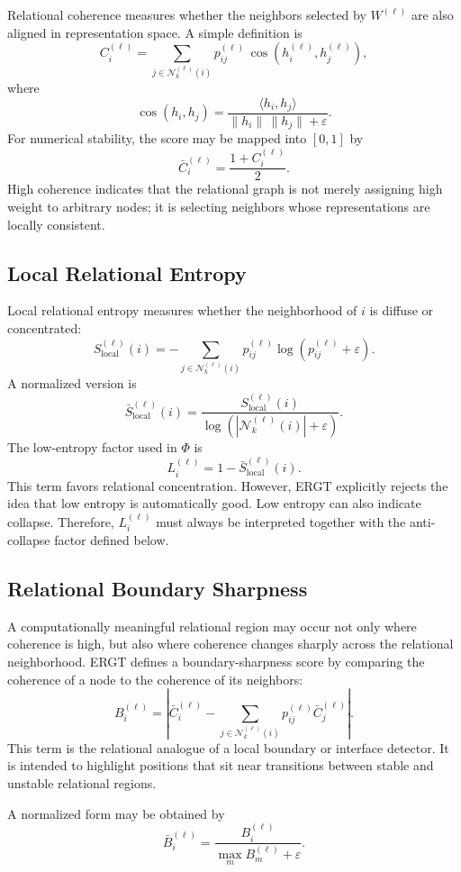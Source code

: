 \documentclass[11pt]{article}
\begin{document}
Relational coherence measures whether the neighbors selected by $W^{(\ell)}$ are also aligned in representation space. A simple definition is
\[
C_i^{(\ell)}
=
\sum_{j\in\mathcal{N}_k^{(\ell)}(i)}
p_{ij}^{(\ell)}\,
\cos(h_i^{(\ell)},h_j^{(\ell)}),
\]
where
\[
\cos(h_i,h_j)
=
\frac{\langle h_i,h_j\rangle}{\|h_i\|\,\|h_j\|+\varepsilon}.
\]
For numerical stability, the score may be mapped into $[0,1]$ by
\[
\bar{C}_i^{(\ell)}=\frac{1+C_i^{(\ell)}}{2}.
\]
High coherence indicates that the relational graph is not merely assigning high weight to arbitrary nodes; it is selecting neighbors whose representations are locally consistent.

\subsection{Local Relational Entropy}

Local relational entropy measures whether the neighborhood of $i$ is diffuse or concentrated:
\[
S_{\mathrm{local}}^{(\ell)}(i)
=
-\sum_{j\in\mathcal{N}_k^{(\ell)}(i)}
p_{ij}^{(\ell)}\log(p_{ij}^{(\ell)}+\varepsilon).
\]
A normalized version is
\[
\bar{S}_{\mathrm{local}}^{(\ell)}(i)
=
\frac{S_{\mathrm{local}}^{(\ell)}(i)}{\log(|\mathcal{N}_k^{(\ell)}(i)|+\varepsilon)}.
\]
The low-entropy factor used in $\Phi$ is
\[
L_i^{(\ell)}=1-\bar{S}_{\mathrm{local}}^{(\ell)}(i).
\]
This term favors relational concentration. However, ERGT explicitly rejects the idea that low entropy is automatically good. Low entropy can also indicate collapse. Therefore, $L_i^{(\ell)}$ must always be interpreted together with the anti-collapse factor defined below.

\subsection{Relational Boundary Sharpness}

A computationally meaningful relational region may occur not only where coherence is high, but also where coherence changes sharply across the relational neighborhood. ERGT defines a boundary-sharpness score by comparing the coherence of a node to the coherence of its neighbors:
\[
B_i^{(\ell)}
=
\left|
\bar{C}_i^{(\ell)}
-
\sum_{j\in\mathcal{N}_k^{(\ell)}(i)}p_{ij}^{(\ell)}\bar{C}_j^{(\ell)}
\right|.
\]
This term is the relational analogue of a local boundary or interface detector. It is intended to highlight positions that sit near transitions between stable and unstable relational regions.

A normalized form may be obtained by
\[
\bar{B}_i^{(\ell)}
=
\frac{B_i^{(\ell)}}{\max_m B_m^{(\ell)}+\varepsilon}.
\]
\end{document}
